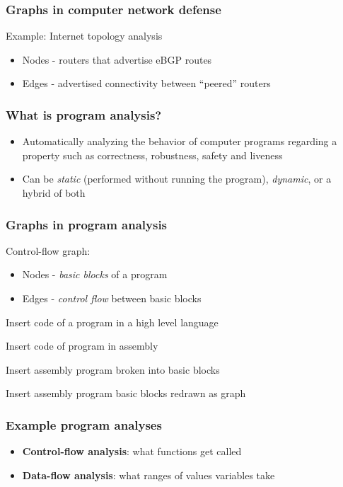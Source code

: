 \documentclass[11pt]{beamer}
\begin{document}
   \begin{frame}
\frametitle{Graphs in computer network defense}
Example: Internet topology analysis
\bigskip
\begin{itemize}
  \item{Nodes - routers that advertise eBGP routes}
    \medskip
  \item{Edges - advertised connectivity between ``peered'' routers}
  \end{itemize}
  \end{frame}


  \begin{frame}
\frametitle{What is program analysis?}
  \begin{itemize}
  \item{ Automatically analyzing the behavior of computer programs regarding a property such as correctness, robustness, safety and liveness}
    \medskip
  \item{Can be \textit{static} (performed without running the program), \textit{dynamic}, or a hybrid of both}
      \end{itemize}
  \end{frame}

  \begin{frame}
\frametitle{Graphs in program analysis}
Control-flow graph:
\begin{itemize}
  \item{Nodes - \textit{basic blocks} of a program}
    \medskip
  \item{Edges - \textit{control flow} between basic blocks}
      \end{itemize}
  \end{frame}

  \begin{frame}
    Insert code of a program in a high level language
  \end{frame}

  \begin{frame}
    Insert code of program in assembly
  \end{frame}

  \begin{frame}
    Insert assembly program broken into basic blocks
  \end{frame}

  \begin{frame}
    Insert assembly program basic blocks redrawn as graph
  \end{frame}

  \begin{frame}
    \frametitle{Example program analyses}
    \begin{itemize}
    \item{\textbf{Control-flow analysis}: what functions get called}
      \medskip
    \item{\textbf{Data-flow analysis}: what ranges of values variables take} 
    \end{itemize}
  \end{frame}
\end{document}
